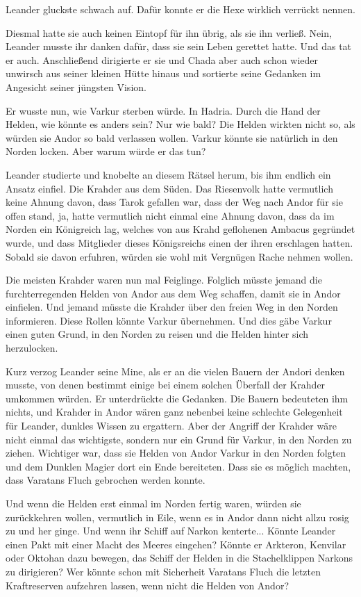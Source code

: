 \documentclass[10pt, a4paper, oneside]{book}
\begin{document}
Leander gluckste schwach auf. Dafür konnte er die Hexe wirklich verrückt nennen.

Diesmal hatte sie auch keinen Eintopf für ihn übrig, als sie ihn verließ. Nein, Leander musste ihr danken dafür, dass sie sein Leben gerettet hatte. Und das tat er auch. Anschließend dirigierte er sie und Chada aber auch schon wieder unwirsch aus seiner kleinen Hütte hinaus und sortierte seine Gedanken im Angesicht seiner jüngsten Vision.

Er wusste nun, wie Varkur sterben würde. In Hadria. Durch die Hand der Helden, wie könnte es anders sein? Nur wie bald? Die Helden wirkten nicht so, als würden sie Andor so bald verlassen wollen. Varkur könnte sie natürlich in den Norden locken. Aber warum würde er das tun?

Leander studierte und knobelte an diesem Rätsel herum, bis ihm endlich ein Ansatz einfiel. Die Krahder aus dem Süden. Das Riesenvolk hatte vermutlich keine Ahnung davon, dass Tarok gefallen war, dass der Weg nach Andor für sie offen stand, ja, hatte vermutlich nicht einmal eine Ahnung davon, dass da im Norden ein Königreich lag, welches von aus Krahd geflohenen Ambacus gegründet wurde, und dass Mitglieder dieses Königsreichs einen der ihren erschlagen hatten. Sobald sie davon erfuhren, würden sie wohl mit Vergnügen Rache nehmen wollen.

Die meisten Krahder waren nun mal Feiglinge. Folglich müsste jemand die furchterregenden Helden von Andor aus dem Weg schaffen, damit sie in Andor einfielen. Und jemand müsste die Krahder über den freien Weg in den Norden informieren. Diese Rollen könnte Varkur übernehmen. Und dies gäbe Varkur einen guten Grund, in den Norden zu reisen und die Helden hinter sich herzulocken.

Kurz verzog Leander seine Mine, als er an die vielen Bauern der Andori denken musste, von denen bestimmt einige bei einem solchen Überfall der Krahder umkommen würden. Er unterdrückte die Gedanken. Die Bauern bedeuteten ihm nichts, und Krahder in Andor wären ganz nebenbei keine schlechte Gelegenheit für Leander, dunkles Wissen zu ergattern. Aber der Angriff der Krahder wäre nicht einmal das wichtigste, sondern nur ein Grund für Varkur, in den Norden zu ziehen. Wichtiger war, dass sie Helden von Andor Varkur in den Norden folgten und dem Dunklen Magier dort ein Ende bereiteten. Dass sie es möglich machten, dass Varatans Fluch gebrochen werden konnte.

Und wenn die Helden erst einmal im Norden fertig waren, würden sie zurückkehren wollen, vermutlich in Eile, wenn es in Andor dann nicht allzu rosig zu und her ginge. Und wenn ihr Schiff auf Narkon kenterte... Könnte Leander einen Pakt mit einer Macht des Meeres eingehen? Könnte er Arkteron, Kenvilar oder Oktohan dazu bewegen, das Schiff der Helden in die Stachelklippen Narkons zu dirigieren? Wer könnte schon mit Sicherheit Varatans Fluch die letzten Kraftreserven aufzehren lassen, wenn nicht die Helden von Andor?
\end{document}

